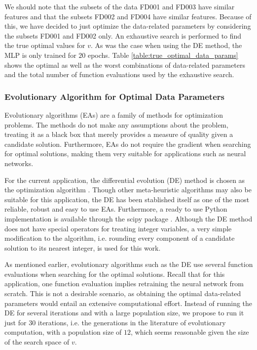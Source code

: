 \documentclass[12pt]{IEEEtran}%
\begin{document}
We should note that the subsets of the data FD001 and FD003 have similar
features and that the subsets FD002 and FD004 have similar features. Because
of this, we have decided to just optimize the data-related parameters by
considering the subsets FD001 and FD002 only. An exhaustive search is
performed to find the true optimal values for $v$. As was the case when using
the DE method, the MLP is only trained for $20$ epochs. Table
\ref{table:true_optimal_data_params} shows the optimal as well as the worst
combinations of data-related parameters and the total number of function
evaluations used by the exhaustive search.

\subsubsection{Evolutionary Algorithm for Optimal Data Parameters}

\label{sec:ea_optimization_process}

Evolutionary algorithms (EAs) are a family of methods for optimization
problems. The methods do not make any assumptions about the problem, treating
it as a black box that merely provides a measure of quality given a candidate
solution. Furthermore, EAs do not require the gradient when searching for
optimal solutions, making them very suitable for applications such as neural networks.

For the current application, the differential evolution (DE) method is chosen
as the optimization algorithm \cite{Storn1997}. Though other meta-heuristic
algorithms may also be suitable for this application, the DE has been
stablished itself as one of the most reliable, robust and easy to use EAs.
Furthermore, a ready to use Python implementation is available through the
scipy package \cite{scipy}. Although the DE method does not have special
operators for treating integer variables, a very simple modification to the
algorithm, i.e. rounding every component of a candidate solution to its
nearest integer, is used for this work.

As mentioned earlier, evolutionary algorithms such as the DE use several
function evaluations when searching for the optimal solutions. Recall that for
this application, one function evaluation implies retraining the neural
network from scratch. This is not a desirable scenario, as obtaining the
optimal data-related parameters would entail an extensive computational
effort. Instead of running the DE for several iterations and with a large
population size, we propose to run it just for $30$ iterations, i.e. the
generations in the literature of evolutionary computation, with a population
size of $12$, which seems reasonable given the size of the search space of $v$.
\end{document}
